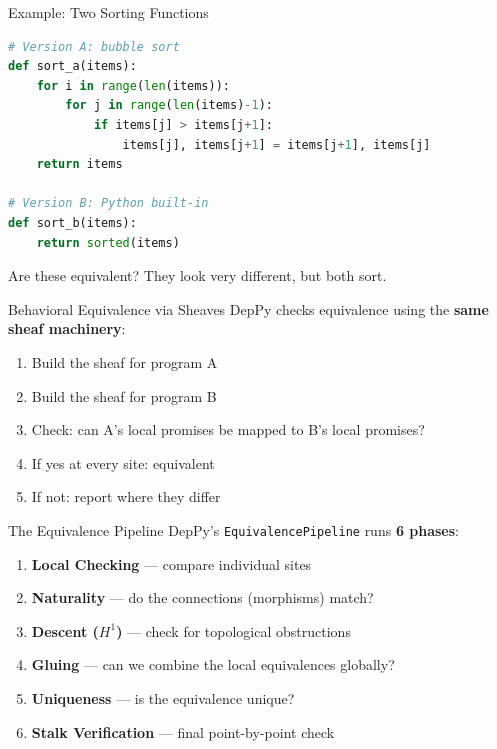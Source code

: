 \documentclass[aspectratio=169,10pt]{beamer}
\begin{document}
\begin{frame}[fragile]{Example: Two Sorting Functions}
\begin{lstlisting}[language=Python, basicstyle=\ttfamily\scriptsize]
# Version A: bubble sort
def sort_a(items):
    for i in range(len(items)):
        for j in range(len(items)-1):
            if items[j] > items[j+1]:
                items[j], items[j+1] = items[j+1], items[j]
    return items

# Version B: Python built-in
def sort_b(items):
    return sorted(items)
\end{lstlisting}
\vspace{0.3em}
Are these equivalent? They look very different, but both sort.
\end{frame}

\begin{frame}{Behavioral Equivalence via Sheaves}
DepPy checks equivalence using the \textbf{same sheaf machinery}:
\vspace{0.3em}
\begin{enumerate}
  \item Build the sheaf for program A
  \item Build the sheaf for program B
  \item Check: can A's local promises be mapped to B's local promises?
  \item If yes at every site: \textcolor{safe}{equivalent}
  \item If not: report \textcolor{danger}{where} they differ
\end{enumerate}
\end{frame}

\begin{frame}{The Equivalence Pipeline}
DepPy's \texttt{EquivalencePipeline} runs \textbf{6 phases}:
\vspace{0.3em}
{\small
\begin{enumerate}
  \item \textbf{Local Checking} --- compare individual sites
  \item \textbf{Naturality} --- do the connections (morphisms) match?
  \item \textbf{Descent ($H^1$)} --- check for topological obstructions
  \item \textbf{Gluing} --- can we combine the local equivalences globally?
  \item \textbf{Uniqueness} --- is the equivalence unique?
  \item \textbf{Stalk Verification} --- final point-by-point check
\end{enumerate}}
\end{frame}
\end{document}
